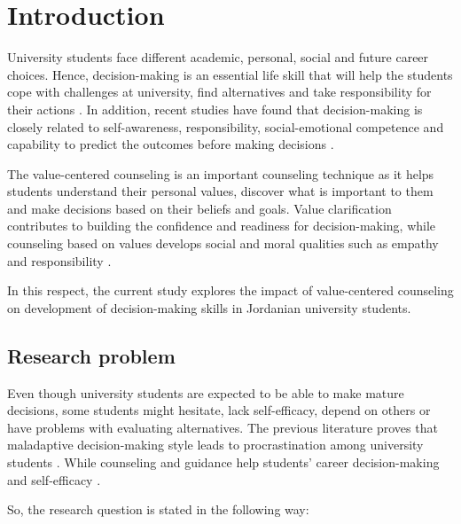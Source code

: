 \documentclass[10pt]{NSP1}
\begin{document}
\maketitle

\raggedbottom
\setlength{\textfloatsep}{12pt plus 2pt minus 2pt}
\setlength{\intextsep}{12pt plus 2pt minus 2pt}
\setlength{\floatsep}{12pt plus 2pt minus 2pt}

\section{Introduction}

University students face different academic, personal, social and future career choices. Hence, decision-making is an essential life skill that will help the students cope with challenges at university, find alternatives and take responsibility for their actions \cite{ref1}. In addition, recent studies have found that decision-making is closely related to self-awareness, responsibility, social-emotional competence and capability to predict the outcomes before making decisions \cite{ref2}.

The value-centered counseling is an important counseling technique as it helps students understand their personal values, discover what is important to them and make decisions based on their beliefs and goals. Value clarification contributes to building the confidence and readiness for decision-making, while counseling based on values develops social and moral qualities such as empathy and responsibility \cite{ref3,ref4}.

In this respect, the current study explores the impact of value-centered counseling on development of decision-making skills in Jordanian university students.

\subsection{Research problem}

Even though university students are expected to be able to make mature decisions, some students might hesitate, lack self-efficacy, depend on others or have problems with evaluating alternatives. The previous literature proves that maladaptive decision-making style leads to procrastination among university students \cite{ref5,ref6}. While counseling and guidance help students' career decision-making and self-efficacy \cite{ref7}.

So, the research question is stated in the following way:
\end{document}
